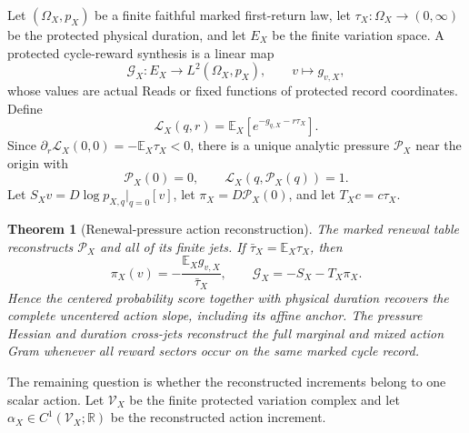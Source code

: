 \documentclass[11pt]{article}
\newtheorem{theorem}{Theorem}[section]
\theoremstyle{definition}
\theoremstyle{remark}
\newcommand{\R}{\mathbb R}
\begin{document}
Let $(\Omega_X,p_X)$ be a finite faithful marked first-return law, let
$\tau_X:\Omega_X\to(0,\infty)$ be the protected physical duration, and let
$E_X$ be the finite variation space.  A protected cycle-reward synthesis is a
linear map
\begin{equation}
 \mathscr G_X:E_X\longrightarrow L^2(\Omega_X,p_X),
 \qquad v\longmapsto g_{v,X},
 \label{eq:main-reward-synthesis}
\end{equation}
whose values are actual Reads or fixed functions of protected record
coordinates.  Define
\begin{equation}
 \mathcal L_X(q,r)
 =\mathbb E_X\!\left[e^{-g_{q,X}-r\tau_X}\right].
 \label{eq:main-reward-laplace}
\end{equation}
Since $\partial_r\mathcal L_X(0,0)=-\mathbb E_X\tau_X<0$, there is a unique
analytic pressure $\mathcal P_X$ near the origin with
\begin{equation}
 \boxed{\mathcal P_X(0)=0,\qquad
 \mathcal L_X(q,\mathcal P_X(q))=1.}
 \label{eq:main-renewal-pressure}
\end{equation}
Let $S_Xv=D\log p_{X,q}|_{q=0}[v]$, let
$\pi_X=D\mathcal P_X(0)$, and let $T_Xc=c\tau_X$.

\begin{theorem}[Renewal-pressure action reconstruction]
\label{thm:main-action-reconstruction}
The marked renewal table reconstructs $\mathcal P_X$ and all of its finite
jets.  If $\bar\tau_X=\mathbb E_X\tau_X$, then
\begin{equation}
 \boxed{
 \pi_X(v)=-\frac{\mathbb E_X g_{v,X}}{\bar\tau_X},
 \qquad
 \mathscr G_X=-S_X-T_X\pi_X.}
 \label{eq:main-action-slope-reconstruction}
\end{equation}
Hence the centered probability score together with physical duration recovers
the complete uncentered action slope, including its affine anchor.  The pressure
Hessian and duration cross-jets reconstruct the full marginal and mixed action
Gram whenever all reward sectors occur on the same marked cycle record.
\end{theorem}

The remaining question is whether the reconstructed increments belong to one
scalar action.  Let $\mathscr V_X$ be the finite protected variation complex and
let $\alpha_X\in C^1(\mathscr V_X;\R)$ be the reconstructed action increment.
\end{document}
